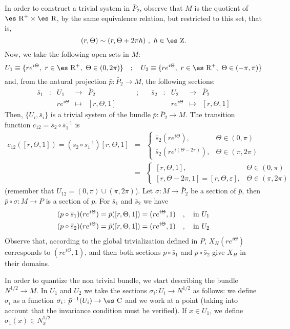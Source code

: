 \documentclass[12pt]{article}
\def\beann{\begin{eqnarray*}}
\def\eeann{\end{eqnarray*}}
\def\Zahl{\mbox{\es Z}}
\def\Real{\mbox{\es R}}
\def\Complex{\mbox{\es C}}
\begin{document}
In order to construct a trivial system in $\bar P_2$,
observe that $M$ is the quotient of $\Real^+ \times \Real$,
by the same equivalence relation,
but restricted to this set, that is,
$$
(r,\Theta ) \sim (r,\Theta +2\pi h) \ , \ h \in \Zahl.
$$
Now, we take the following open sets in $M$:
$$
U_1 \equiv \{re^{i\Theta}, \ r \in \Real^+, \ \Theta \in (0,2\pi ) \}
\quad ; \quad
U_2 \equiv \{re^{i\Theta}, \ r \in \Real^+, \ \Theta \in (-\pi,\pi ) \}
$$
and, from the natural projection
$\bar p \colon \bar P_2 \to M$, the following sections:
$$
\begin{array}{ccccccccccc}
\bar s_1 & \colon & U_1 & \to & \bar P_2
& \qquad ; \quad &
\bar s_2 & \colon & U_2 & \to & \bar P_2
\\
& & re^{i\Theta} & \mapsto & [r, \Theta ,1]
& \qquad &
& & re^{i\Theta} & \mapsto & [r, \Theta ,1]
\end{array}
$$
Then, $\{U_i,\bar s_i \}$ is a trivial system of the bundle
$\bar p \colon \bar P_2 \to M$. The transition function
$c_{12} = \bar s_2 \circ \bar s_1^{-1}$ is
\beann
c_{12}([r,\Theta ,1]) =
(\bar s_2 \circ \bar s_1^{-1})[r,\Theta ,1] &=&
\left\{ \begin{array}{cc}
\bar s_2(re^{i\Theta}), & \mbox{$\Theta \in (0,\pi )$}
\\
\bar s_2(re^{i(\Theta -2\pi )}), & \mbox{$\Theta \in (\pi ,2\pi )$}
\end{array}
\right.
\\ &=&
\left\{ \begin{array}{cc}
[r,\Theta ,1], & \mbox{$\Theta \in (0,\pi )$}
\\
{}[r,\Theta -2\pi ,1]=[r,\Theta ,\varepsilon ],
& \mbox{$\Theta \in (\pi ,2\pi )$}
\end{array}
\right.
\eeann
(remember that $U_{12}=(0,\pi )\cup (\pi ,2\pi)$).
Let $\sigma \colon M \to \bar P_2$ be a section of $\bar p$,
then $\bar p \circ \sigma \colon M \to P$ is a section of $p$.
For $\bar s_1$ and $\bar s_2$ we have
\beann
(p \circ \bar s_1)(re^{i\Theta}) =\bar p([r,\Theta ,1])
=(re^{i\Theta},1)
\quad ,\quad {\rm in}\ U_1
\\
(p \circ \bar s_2)(re^{i\Theta}) = \bar p([r,\Theta ,1])
=(re^{i\Theta},1)
\quad ,\quad {\rm in}\ U_2
\eeann
Observe that, according to the global trivialization defined in $P$,
$X_H(re^{i\Theta})$ corresponds to $(re^{i\Theta},1)$,
and then both sections $p \circ \bar s_1$ and $p \circ \bar s_2$
give $X_H$ in their domains.

In order to quantize the non trivial bundle, we start describing the
bundle
$N^{1/2} \to M$. In $U_1$ and $U_2$ we take the sections
$\sigma_i \colon U_i \to N^{1/2}$ as follows:
we define $\sigma_i$ as a function
 $\sigma_i \colon \bar p^{-1}(U_i) \to\Complex$
and we work at a point (taking into account that the invariance
condition
must be verified). If $x \in U_1$, we define $\sigma_1(x) \in N_x^{1/2}$
\end{document}
